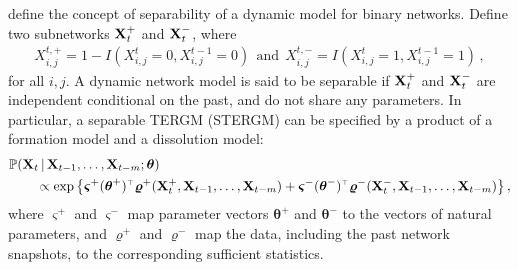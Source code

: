 \documentclass[12pt]{article}
\newcommand{\bvarsigma}{\boldsymbol \varsigma}
\newcommand{\bvarrho}{\boldsymbol \varrho}
\newcommand{\btheta}{\boldsymbol \theta}
\def\T{{\scriptscriptstyle \top} }
\newcommand{\0}{{\bf 0}}
\begin{document}
\cite{Krivitsky2014_supp}
define the concept of separability of a dynamic model for binary networks.
Define two subnetworks ${\bf X}^+_t$ and ${\bf X}^-_t$, where
\begin{align} \label{eq_X+-}
    X_{i,j}^{t,+} = 1 - I(X_{i,j}^t=0,X_{i,j}^{t-1}=0) ~~\text{and}~~X_{i,j}^{t,-}= I(X_{i,j}^t=1,X_{i,j}^{t-1}=1)\,,
\end{align}
for all $i,j$.
A dynamic network model is said to be separable if ${\bf X}^+_t$ and ${\bf X}^-_t$ are independent conditional on the past, and do not share any parameters.
In particular, a separable TERGM (STERGM) can be specified by a product of a formation model and a dissolution model:
\begin{align}
  &\mathbb{P}({\bf X}_t \,|\, {\bf X}_{t-1}, \ldots, {\bf X}_{t-m} ; \btheta) \notag \\& ~~~~~~\propto \exp \big\{ \bvarsigma^+(\btheta^+)^{\T} \bvarrho^+({\bf X}^+_t, {\bf X}_{t-1}, \ldots, {\bf X}_{t-m}) + \bvarsigma^-(\btheta^-)^{\T} \bvarrho^-({\bf X}_t^-, {\bf X}_{t-1}, \ldots, {\bf X}_{t-m})\big\}\,, \label{stergm_def}
\end{align}
where $\bvarsigma^+$ and $\bvarsigma^-$ map parameter vectors $\btheta^+$ and $\btheta^-$ to the vectors of natural parameters, and $\bvarrho^+$ and $\bvarrho^-$ map the data, including the past network snapshots, to the corresponding sufficient statistics.

\end{document}
